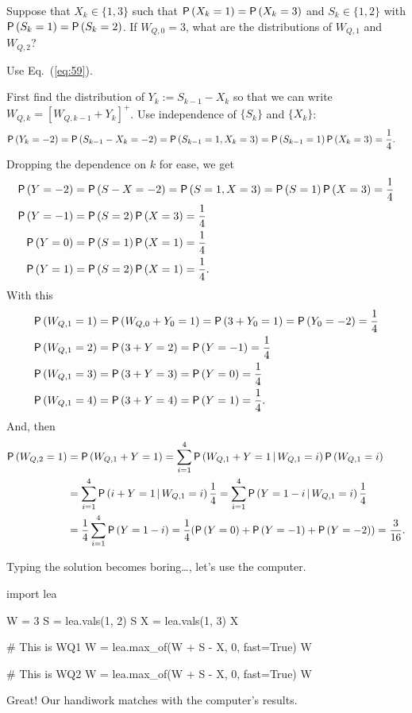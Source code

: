 \begin{exercise}
  Suppose that $X_k\in\{1,3\}$ such that $\P{X_k=1}=\P{X_k=3}$ and
  $S_k\in\{1,2\}$ with $\P{S_k=1}=\P{S_k=2}$. If $W_{Q,0}=3$, what are
  the distributions of $W_{Q,1}$ and $W_{Q,2}$?  
  \begin{hint}
Use Eq.~(\ref{eq:59}).
\end{hint}
\begin{solution}  First find the distribution of $Y_k:=S_{k-1}-X_k$ so that we can write
  $W_{Q,k}=[W_{Q,k-1}+Y_k]^+$.  Use independence of $\{S_k\}$ and $\{X_k\}$:
\begin{align*}
  \P{Y_k=-2} &=\P{S_{k-1}-X_k=-2} = \P{S_{k-1}=1, X_k=3} = \P{S_{k-1}=1}\P{X_k=3} = \frac14.
\end{align*}
Dropping the dependence on $k$ for ease, we get
\begin{align*}
  \P{Y=-2} &=\P{S-X=-2} = \P{S=1, X=3} = \P{S=1}\P{X=3} = \frac14\\
  \P{Y=-1} &=\P{S=2}\P{X=3} = \frac14\\
  \P{Y=0} &=\P{S=1}\P{X=1} = \frac14\\
  \P{Y=1} &=\P{S=2}\P{X=1} = \frac14.
\end{align*}
With this
  \begin{align*}
    \P{W_{Q,1} = 1} &=\P{W_{Q,0} + Y_0= 1} = \P{3 + Y_0 =1} = \P{Y_0=-2} =\frac14\\
    \P{W_{Q,1} = 2} &= \P{3 + Y =2} = \P{Y=-1}  =\frac14\\
    \P{W_{Q,1} = 3} &= \P{3 + Y = 3} = \P{Y=0}  =\frac14\\
    \P{W_{Q,1} = 4} &= \P{3 + Y = 4} = \P{Y=1}  =\frac14.\\
  \end{align*}
And, then
  \begin{equation*}
    \begin{split}
    \P{W_{Q,2} = 1} 
&=\P{W_{Q,1} + Y = 1} = \sum_{i=1}^4 \P{W_{Q,1} + Y = 1\given W_{Q,1}=i}\P{W_{Q,1}=i}\\
&=\sum_{i=1}^4 \P{i + Y = 1\given W_{Q,1}=i}\frac14
=\sum_{i=1}^4 \P{Y = 1-i\given W_{Q,1}=i}\frac14\\
&=\frac14\sum_{i=1}^4 \P{Y = 1-i} = \frac14(\P{Y = 0} + \P{Y=-1} +\P{Y=-2}) = \frac{3}{16}.
    \end{split}
  \end{equation*}

Typing the solution becomes  boring\ldots, let's use the computer.

\begin{pyconsole}
import lea

W = 3
S = lea.vals(1,  2)
S
X = lea.vals(1,  3)
X

# This is WQ1
W = lea.max_of(W + S - X, 0, fast=True)
W

# This is WQ2
W = lea.max_of(W + S - X, 0, fast=True)
W
\end{pyconsole}
Great! Our handiwork matches with the computer's results. 

\end{solution}
\end{exercise}


